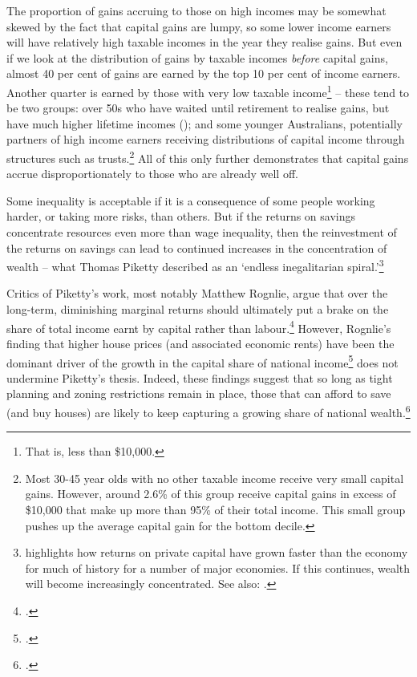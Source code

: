 The proportion of gains accruing to those on high incomes may be somewhat skewed by the fact that capital gains are lumpy, so some lower income earners will have relatively high taxable incomes in the year they realise gains. But even if we look at the distribution of gains by taxable incomes \emph{before} capital gains, almost 40 per cent of gains are earned by the top 10 per cent of income earners. Another quarter is earned by those with very low taxable income\footnote{That is, less than \$10,000.}  – these tend to be two groups: over 50s who have waited until retirement to realise gains, but have much higher lifetime incomes (); and some younger Australians, potentially partners of high income earners receiving distributions of capital income through structures such as trusts.\footnote{Most 30-45 year olds with no other taxable income receive very small capital gains. However, around 2.6\% of this group receive capital gains in excess of \$10,000 that make up more than 95\% of their total income. This small group pushes up the average capital gain for the bottom decile.} All of this only further demonstrates that capital gains accrue disproportionately to those who are already well off. 

Some inequality is acceptable if it is a consequence of some people working harder, or taking more risks, than others. But if the returns on savings concentrate resources even more than wage inequality, then the reinvestment of the returns on savings can lead to continued increases in the concentration of wealth – what Thomas Piketty described as an ‘endless inegalitarian spiral.’\footnote{\textcite{Piketty2013} highlights how returns on private capital have grown faster than the economy for much of history for a number of major economies. If this continues, wealth will become increasingly concentrated. See also: \textcite[][]{Leigh2013}.}

Critics of Piketty’s work, most notably Matthew Rognlie, argue that over the long-term, diminishing marginal returns should ultimately put a brake on the share of total income earnt by capital rather than labour.\footcite[][2]{Rognlie2014OnPiketty} However, Rognlie’s finding that higher house prices (and associated economic rents) have been the dominant driver of the growth in the capital share of national income\footcite[][3]{Rognlie2014OnPiketty} does not undermine Piketty’s thesis. Indeed, these findings suggest that so long as tight planning and zoning restrictions remain in place, those that can afford to save (and buy houses) are likely to keep capturing a growing share of national wealth.\footcite[][]{TheEconomist2015NIMBYs}  

